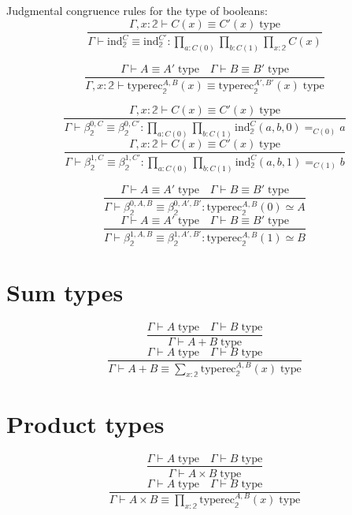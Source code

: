 \documentclass{book}
\begin{document}
Judgmental congruence rules for the type of booleans:
$$\frac{\Gamma, x:\mathbb{2} \vdash C(x) \equiv C'(x) \; \mathrm{type}}{\Gamma \vdash \mathrm{ind}_\mathbb{2}^C \equiv \mathrm{ind}_\mathbb{2}^{C'}:\prod_{a:C(0)} \prod_{b:C(1)} \prod_{x:\mathbb{2}} C(x)}$$

$$\frac{\Gamma \vdash A \equiv A' \; \mathrm{type} \quad \Gamma \vdash B \equiv B' \; \mathrm{type}}{\Gamma, x:\mathbb{2} \vdash \mathrm{typerec}_\mathbb{2}^{A, B}(x) \equiv \mathrm{typerec}_\mathbb{2}^{A', B'}(x) \; \mathrm{type}}$$

$$\frac{\Gamma, x:\mathbb{2} \vdash C(x) \equiv C'(x) \; \mathrm{type}}{\Gamma \vdash \beta_\mathbb{2}^{0, C} \equiv \beta_\mathbb{2}^{0, C'}:\prod_{a:C(0)} \prod_{b:C(1)} \mathrm{ind}_\mathbb{2}^C(a, b, 0) =_{C(0)} a}$$
$$\frac{\Gamma, x:\mathbb{2} \vdash C(x) \equiv C'(x) \; \mathrm{type}}{\Gamma \vdash \beta_\mathbb{2}^{1, C} \equiv \beta_\mathbb{2}^{1, C'}:\prod_{a:C(0)} \prod_{b:C(1)} \mathrm{ind}_\mathbb{2}^C(a, b, 1) =_{C(1)} b}$$

$$\frac{\Gamma \vdash A \equiv A' \; \mathrm{type} \quad \Gamma \vdash B \equiv B' \; \mathrm{type}}{\Gamma \vdash \beta_\mathbb{2}^{0, A, B} \equiv \beta_\mathbb{2}^{0, A', B'}:\mathrm{typerec}_\mathbb{2}^{A, B}(0) \simeq A}$$
$$\frac{\Gamma \vdash A \equiv A' \; \mathrm{type} \quad \Gamma \vdash B \equiv B' \; \mathrm{type}}{\Gamma \vdash \beta_\mathbb{2}^{1, A, B} \equiv \beta_\mathbb{2}^{1, A', B'}:\mathrm{typerec}_\mathbb{2}^{A, B}(1) \simeq B}$$

\section{Sum types}
$$\frac{\Gamma \vdash A \; \mathrm{type} \quad \Gamma \vdash B \; \mathrm{type}}{\Gamma \vdash A + B \; \mathrm{type}}$$
$$\frac{\Gamma \vdash A \; \mathrm{type} \quad \Gamma \vdash B \; \mathrm{type}}{\Gamma \vdash A + B \equiv \sum_{x:\mathbb{2}} \mathrm{typerec}_\mathbb{2}^{A, B}(x) \; \mathrm{type}}$$

\section{Product types}
$$\frac{\Gamma \vdash A \; \mathrm{type} \quad \Gamma \vdash B \; \mathrm{type}}{\Gamma \vdash A \times B \; \mathrm{type}}$$
$$\frac{\Gamma \vdash A \; \mathrm{type} \quad \Gamma \vdash B \; \mathrm{type}}{\Gamma \vdash A \times B \equiv \prod_{x:\mathbb{2}} \mathrm{typerec}_\mathbb{2}^{A, B}(x) \; \mathrm{type}}$$
\end{document}
